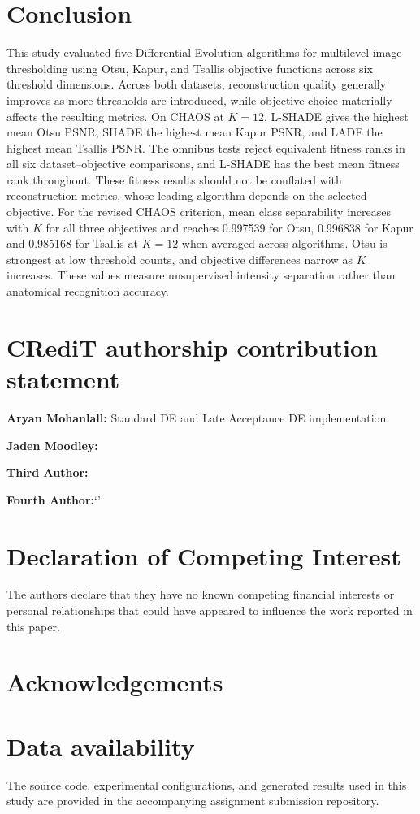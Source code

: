 \documentclass[review]{elsarticle}
\begin{document}


\section{Conclusion}
\label{sec:conclusion}

This study evaluated five Differential Evolution algorithms for
multilevel image thresholding using Otsu, Kapur, and Tsallis objective
functions across six threshold dimensions.
Across both datasets, reconstruction quality generally improves as more
thresholds are introduced, while objective choice materially affects
the resulting metrics. On CHAOS at $K=12$, L-SHADE gives the highest
mean Otsu PSNR, SHADE the highest mean Kapur PSNR, and LADE the highest
mean Tsallis PSNR. The omnibus tests reject equivalent fitness ranks in
all six dataset--objective comparisons, and L-SHADE has the best mean
fitness rank throughout. These fitness results should not be conflated
with reconstruction metrics, whose leading algorithm depends on the
selected objective.
For the revised CHAOS criterion, mean class separability increases with $K$
for all three objectives and reaches 0.997539 for Otsu, 0.996838 for Kapur and
0.985168 for Tsallis at $K=12$ when averaged across algorithms. Otsu is
strongest at low threshold counts, and objective differences narrow as $K$
increases. These values measure unsupervised intensity separation rather than
anatomical recognition accuracy.




\section*{CRediT authorship contribution statement}

\textbf{Aryan Mohanlall:}
Standard DE and Late Acceptance DE implementation.

\textbf{Jaden Moodley:}

\textbf{Third Author:}

\textbf{Fourth Author:}`'





\section*{Declaration of Competing Interest}

The authors declare that they have no known competing financial
interests or personal relationships that could have appeared to
influence the work reported in this paper.


\section*{Acknowledgements}



\section*{Data availability}

The source code, experimental configurations, and generated results
used in this study are provided in the accompanying assignment
submission repository.







\end{document}
